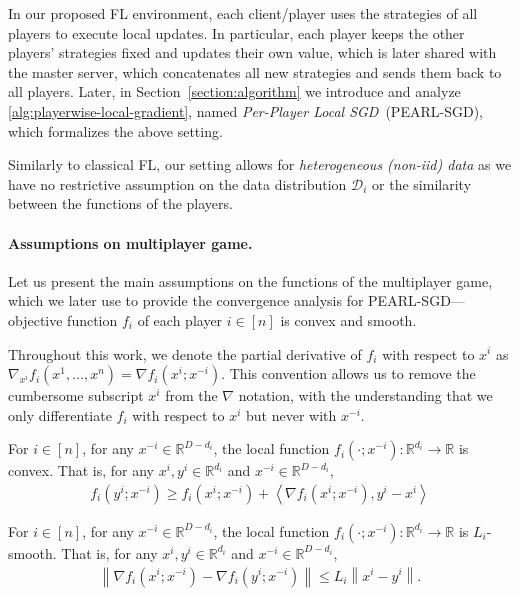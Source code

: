 \documentclass{article}
\newcommand{\algname}[1]{{\color{PineGreen}\sf  #1}\xspace}
\newcommand{\cD}{{\mathcal{D}}}
\newcommand{\reals}{\mathbb{R}}
\newcommand{\inprod}[2]{\left\langle #1,#2 \right\rangle}
\newcommand{\norm}[1]{\left\|#1\right\|}
\newcommand{\fullname}{Per-Player Local SGD}
\newcommand{\abbvname}{\algname{PEARL-SGD}}
\theoremstyle{plain}
\theoremstyle{remark}
\begin{document}
\newpage

In our proposed FL environment, each client/player uses the strategies of all players to execute local updates. In particular, each player keeps the other players' strategies fixed and updates their own value, which is later shared with the master server, which concatenates all new strategies and sends them back to all players.  Later, in Section~\ref{section:algorithm} we introduce and analyze \cref{alg:playerwise-local-gradient}, named \emph{\fullname}~(\abbvname), which formalizes the above setting. 

Similarly to classical FL, our setting allows for \emph{heterogeneous (non-iid) data} as we have no restrictive assumption on the data distribution $\cD_i$ or the similarity between the functions of the players. 

\paragraph{Assumptions on multiplayer game.} Let us present the main assumptions on the functions of the multiplayer game, which we later use to provide the convergence analysis for \abbvname---objective function $f_i$ of each player $i \in [n]$ is convex and smooth.

Throughout this work, we denote the partial derivative of $f_i$ with respect to $x^i$ as $\nabla_{x^i} f_i (x^1,\dots,x^n) = \nabla f_i (x^i; x^{-i})$.
This convention allows us to remove the cumbersome subscript $x^i$ from the $\nabla$ notation, with the understanding that we only differentiate $f_i$ with respect to $x^i$ but never with $x^{-i}$.

\vspace{-5mm}

\noindent
\begin{assumption}
\label{assumption:convexity}
For $i\in [n]$, for any $x^{-i} \in \reals^{D-d_i}$, the local function $f_i(\cdot; x^{-i}) \colon \reals^{d_i} \to \reals$ is convex. 
That is, for any $x^i, y^i \in \reals^{d_i}$ and $x^{-i} \in \reals^{D-d_i}$,
\begin{align*}
    f_i (y^i; x^{-i}) \ge f_i (x^i; x^{-i}) + \inprod{\nabla f_i (x^i; x^{-i})}{y^i - x^i} 
\end{align*}    
\end{assumption}

\vspace{-2mm}

\begin{assumption}
\label{assumption:smoothness}
For $i\in [n]$, for any $x^{-i} \in \reals^{D-d_i}$, the local function $f_i(\cdot; x^{-i}) \colon \reals^{d_i} \to \reals$ is $L_i$-smooth.
That is, for any $x^i, y^i \in \reals^{d_i}$ and $x^{-i} \in \reals^{D-d_i}$,
\begin{align*}
    \norm{\nabla f_i (x^i; x^{-i}) - \nabla f_i (y^i; x^{-i})} \le L_i \norm{x^i - y^i} .
\end{align*}
\end{assumption}
\end{document}
